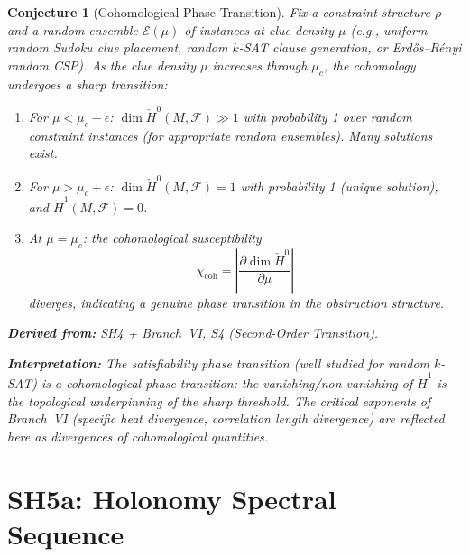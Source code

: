 \documentclass[11pt,letterpaper]{article}
\newtheorem{conjecture}{Conjecture}[section]
\newcommand{\Hcech}{\check{H}}
\newcommand{\sheaf}{\mathcal{F}}
\begin{document}
\begin{conjecture}[Cohomological Phase 
Transition]\label{conj:coh_phase}
Fix a constraint structure $\rho$ and a random ensemble 
$\mathcal{E}(\mu)$ of instances at clue density $\mu$ (e.g., uniform 
random Sudoku clue placement, random $k$-SAT clause generation, or 
Erd\H{o}s--R\'{e}nyi random CSP). As the clue density $\mu$ increases 
through $\mu_c$, the cohomology undergoes a sharp transition:

\begin{enumerate}[label=(\alph*)]
    \item For $\mu < \mu_c - \epsilon$: $\dim \Hcech^0(M, \sheaf) 
    \gg 1$ with probability 1 over random constraint instances (for 
    appropriate random ensembles). Many solutions exist.
    
    \item For $\mu > \mu_c + \epsilon$: $\dim \Hcech^0(M, \sheaf) = 1$ 
    with probability 1 (unique solution), and $\Hcech^1(M, \sheaf) = 0$.
    
    \item At $\mu = \mu_c$: the \emph{cohomological susceptibility}
    \begin{equation}\label{eq:coh_susceptibility}
        \chi_{\mathrm{coh}} = \left|\frac{\partial \dim \Hcech^0}
        {\partial \mu}\right|
    \end{equation}
    diverges, indicating a genuine phase transition in the obstruction 
    structure.
\end{enumerate}

\textbf{Derived from:} SH4 + Branch~VI, S4 (Second-Order Transition).

\textbf{Interpretation:} The satisfiability phase transition (well 
studied for random $k$-SAT) is a \emph{cohomological phase transition}: 
the vanishing/non-vanishing of $\Hcech^1$ is the topological 
underpinning of the sharp threshold. The critical exponents of 
Branch~VI (specific heat divergence, correlation length divergence) 
are reflected here as divergences of cohomological quantities.
\end{conjecture}

\section{SH5a: Holonomy Spectral Sequence}
\end{document}
